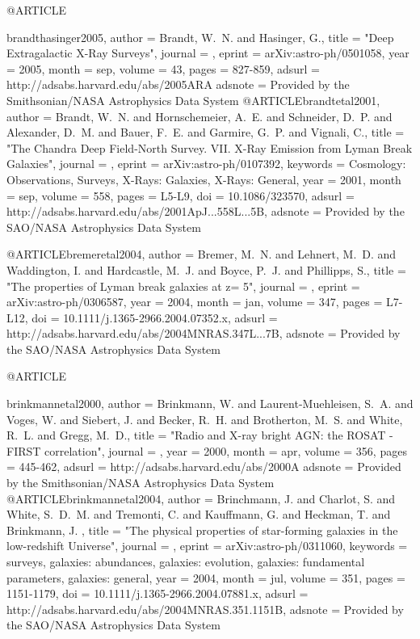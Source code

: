 {{{{{{{{@ARTICLE{brandthasinger2005,
   author = {{Brandt}, W.~N. and {Hasinger}, G.},
    title = "{Deep Extragalactic X-Ray Surveys}",
  journal = {\araa},
   eprint = {arXiv:astro-ph/0501058},
     year = 2005,
    month = sep,
   volume = 43,
    pages = {827-859},
   adsurl = {http://adsabs.harvard.edu/abs/2005ARA%
  adsnote = {Provided by the Smithsonian/NASA Astrophysics Data System}
}
@ARTICLE{brandtetal2001,
   author = {{Brandt}, W.~N. and {Hornschemeier}, A.~E. and {Schneider}, D.~P. and 
	{Alexander}, D.~M. and {Bauer}, F.~E. and {Garmire}, G.~P. and 
	{Vignali}, C.},
    title = "{The Chandra Deep Field-North Survey. VII. X-Ray Emission from Lyman Break Galaxies}",
  journal = {\apjl},
   eprint = {arXiv:astro-ph/0107392},
 keywords = {Cosmology: Observations, Surveys, X-Rays: Galaxies, X-Rays: General},
     year = 2001,
    month = sep,
   volume = 558,
    pages = {L5-L9},
      doi = {10.1086/323570},
   adsurl = {http://adsabs.harvard.edu/abs/2001ApJ...558L...5B},
  adsnote = {Provided by the SAO/NASA Astrophysics Data System}
}


@ARTICLE{bremeretal2004,
   author = {{Bremer}, M.~N. and {Lehnert}, M.~D. and {Waddington}, I. and 
	{Hardcastle}, M.~J. and {Boyce}, P.~J. and {Phillipps}, S.},
    title = "{The properties of Lyman break galaxies at z= 5}",
  journal = {\mnras},
   eprint = {arXiv:astro-ph/0306587},
     year = 2004,
    month = jan,
   volume = 347,
    pages = {L7-L12},
      doi = {10.1111/j.1365-2966.2004.07352.x},
   adsurl = {http://adsabs.harvard.edu/abs/2004MNRAS.347L...7B},
  adsnote = {Provided by the SAO/NASA Astrophysics Data System}
}


@ARTICLE{brinkmannetal2000,
   author = {{Brinkmann}, W. and {Laurent-Muehleisen}, S.~A. and {Voges}, W. and 
	{Siebert}, J. and {Becker}, R.~H. and {Brotherton}, M.~S. and 
	{White}, R.~L. and {Gregg}, M.~D.},
    title = "{Radio and X-ray bright AGN: the ROSAT - FIRST correlation}",
  journal = {\aap},
     year = 2000,
    month = apr,
   volume = 356,
    pages = {445-462},
   adsurl = {http://adsabs.harvard.edu/abs/2000A%
  adsnote = {Provided by the Smithsonian/NASA Astrophysics Data System}
}
@ARTICLE{brinkmannetal2004,
   author = {{Brinchmann}, J. and {Charlot}, S. and {White}, S.~D.~M. and 
	{Tremonti}, C. and {Kauffmann}, G. and {Heckman}, T. and {Brinkmann}, J.
	},
    title = "{The physical properties of star-forming galaxies in the low-redshift Universe}",
  journal = {\mnras},
   eprint = {arXiv:astro-ph/0311060},
 keywords = {surveys, galaxies: abundances, galaxies: evolution, galaxies: fundamental parameters, galaxies: general},
     year = 2004,
    month = jul,
   volume = 351,
    pages = {1151-1179},
      doi = {10.1111/j.1365-2966.2004.07881.x},
   adsurl = {http://adsabs.harvard.edu/abs/2004MNRAS.351.1151B},
  adsnote = {Provided by the SAO/NASA Astrophysics Data System}
}


}}}}}}}}}}
